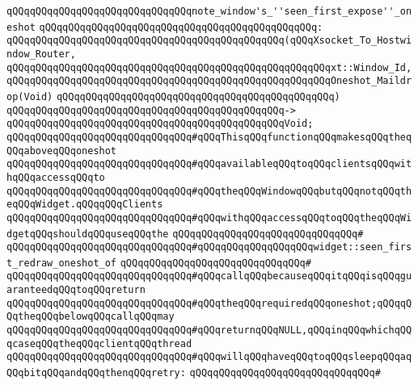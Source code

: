 \verb|qQQqqQQqqQQqqQQqqQQqqQQqqQQqqQQqnote_window's_''seen_first_expose''_oneshot|\newline
\verb|qQQqqQQqqQQqqQQqqQQqqQQqqQQqqQQqqQQqqQQqqQQqqQQq:|\newline
\verb|qQQqqQQqqQQqqQQqqQQqqQQqqQQqqQQqqQQqqQQqqQQqqQQq(qQQqXsocket_To_Hostwindow_Router,|\newline
\verb|qQQqqQQqqQQqqQQqqQQqqQQqqQQqqQQqqQQqqQQqqQQqqQQqqQQqqQQqxt::Window_Id,|\newline
\verb|qQQqqQQqqQQqqQQqqQQqqQQqqQQqqQQqqQQqqQQqqQQqqQQqqQQqqQQqOneshot_Maildrop(Void)|\newline
\verb|qQQqqQQqqQQqqQQqqQQqqQQqqQQqqQQqqQQqqQQqqQQqqQQq)|\newline
\verb|qQQqqQQqqQQqqQQqqQQqqQQqqQQqqQQqqQQqqQQqqQQqqQQq->|\newline
\verb|qQQqqQQqqQQqqQQqqQQqqQQqqQQqqQQqqQQqqQQqqQQqqQQqVoid;|\newline
\newline
\verb|qQQqqQQqqQQqqQQqqQQqqQQqqQQqqQQq#qQQqThisqQQqfunctionqQQqmakesqQQqtheqQQqaboveqQQqoneshot|\newline
\verb|qQQqqQQqqQQqqQQqqQQqqQQqqQQqqQQq#qQQqavailableqQQqtoqQQqclientsqQQqwithqQQqaccessqQQqto|\newline
\verb|qQQqqQQqqQQqqQQqqQQqqQQqqQQqqQQq#qQQqtheqQQqWindowqQQqbutqQQqnotqQQqtheqQQqWidget.qQQqqQQqClients|\newline
\verb|qQQqqQQqqQQqqQQqqQQqqQQqqQQqqQQq#qQQqwithqQQqaccessqQQqtoqQQqtheqQQqWidgetqQQqshouldqQQquseqQQqthe|\newline
\verb|qQQqqQQqqQQqqQQqqQQqqQQqqQQqqQQq#|\newline
\verb|qQQqqQQqqQQqqQQqqQQqqQQqqQQqqQQq#qQQqqQQqqQQqqQQqqQQqwidget::seen_first_redraw_oneshot_of|\newline
\verb|qQQqqQQqqQQqqQQqqQQqqQQqqQQqqQQq#|\newline
\verb|qQQqqQQqqQQqqQQqqQQqqQQqqQQqqQQq#qQQqcallqQQqbecauseqQQqitqQQqisqQQqguaranteedqQQqtoqQQqreturn|\newline
\verb|qQQqqQQqqQQqqQQqqQQqqQQqqQQqqQQq#qQQqtheqQQqrequiredqQQqoneshot;qQQqqQQqtheqQQqbelowqQQqcallqQQqmay|\newline
\verb|qQQqqQQqqQQqqQQqqQQqqQQqqQQqqQQq#qQQqreturnqQQqNULL,qQQqinqQQqwhichqQQqcaseqQQqtheqQQqclientqQQqthread|\newline
\verb|qQQqqQQqqQQqqQQqqQQqqQQqqQQqqQQq#qQQqwillqQQqhaveqQQqtoqQQqsleepqQQqaqQQqbitqQQqandqQQqthenqQQqretry:|\newline
\verb|qQQqqQQqqQQqqQQqqQQqqQQqqQQqqQQq#|\newline
